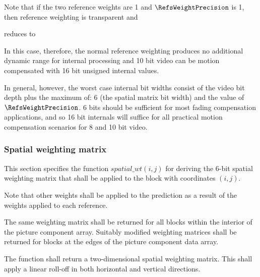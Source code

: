 \begin{informative}
Note that if the two reference weights are 1 and $\RefsWeightPrecision$ is 1, then
reference weighting is transparent and

\begin{pseudo*}
\bsCODE{\ldots}
\end{pseudo*}

reduces to

\begin{pseudo*}
\bsCODE{\ldots}
\end{pseudo*}

In this case, therefore, the normal reference weighting produces no additional dynamic
range for internal processing and 10 bit video can be motion compensated with 16 bit
unsigned internal values.

In general, however, the worst case internal bit widths consist of the video bit depth plus the maximum of: 6 (the spatial matrix bit width) and the value of $\RefsWeightPrecision$. 6 bits
should be sufficient for most fading compensation applications, and so 16 bit internals will
suffice for all practical motion compensation scenarios for 8 and 10 bit video.
\end{informative}


\subsubsection{Spatial weighting matrix}

\label{mcspatialweights}

This section specifies the function $spatial\_wt(i,j)$ for deriving the 6-bit spatial weighting 
matrix that shall be applied to the block with coordinates  $(i,j)$. 

Note that other weights shall be applied to the prediction as a result of the 
weights applied to each reference.

The same weighting matrix shall be returned for all blocks within the interior
of the picture component array. Suitably modified weighting matrices shall
be returned for blocks at the edges of the picture component data array.

The function shall return a two-dimensional spatial weighting matrix. This
shall apply a linear roll-off in both horizontal and vertical directions.

